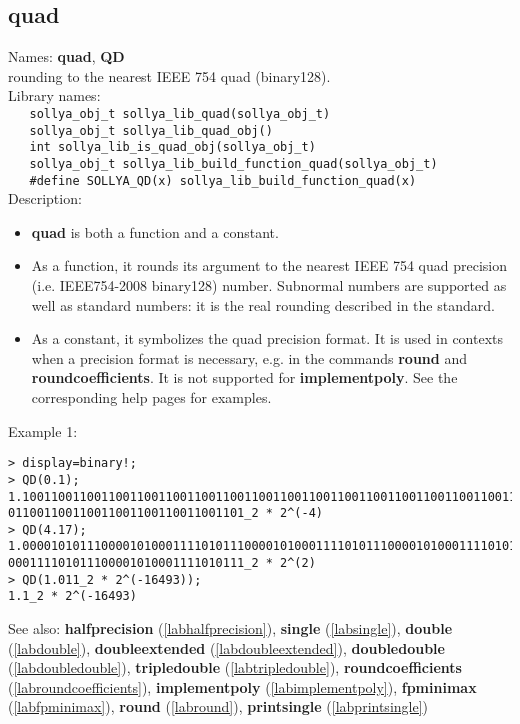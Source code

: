 \subsection{quad}
\label{labquad}
\noindent Names: \textbf{quad}, \textbf{QD}\\
\phantom{aaa}rounding to the nearest IEEE 754 quad (binary128).\\[0.2cm]
\noindent Library names:\\
\verb|   sollya_obj_t sollya_lib_quad(sollya_obj_t)|\\
\verb|   sollya_obj_t sollya_lib_quad_obj()|\\
\verb|   int sollya_lib_is_quad_obj(sollya_obj_t)|\\
\verb|   sollya_obj_t sollya_lib_build_function_quad(sollya_obj_t)|\\
\verb|   #define SOLLYA_QD(x) sollya_lib_build_function_quad(x)|\\[0.2cm]
\noindent Description: \begin{itemize}

\item \textbf{quad} is both a function and a constant.

\item As a function, it rounds its argument to the nearest IEEE 754 quad precision (i.e. IEEE754-2008 binary128) number.
   Subnormal numbers are supported as well as standard numbers: it is the real
   rounding described in the standard.

\item As a constant, it symbolizes the quad precision format. It is used in 
   contexts when a precision format is necessary, e.g. in the commands 
   \textbf{round} and \textbf{roundcoefficients}. It is not supported for \textbf{implementpoly}.
   See the corresponding help pages for examples.
\end{itemize}
\noindent Example 1: 
\begin{center}\begin{minipage}{15cm}\begin{Verbatim}[frame=single,commandchars=\\\|\~]
> display=binary!;
> QD(0.1);
1.100110011001100110011001100110011001100110011001100110011001100110011001100110
011001100110011001100110011001101_2 * 2^(-4)
> QD(4.17);
1.000010101110000101000111101011100001010001111010111000010100011110101110000101
000111101011100001010001111010111_2 * 2^(2)
> QD(1.011_2 * 2^(-16493));
1.1_2 * 2^(-16493)
\end{Verbatim}
\end{minipage}\end{center}
See also: \textbf{halfprecision} (\ref{labhalfprecision}), \textbf{single} (\ref{labsingle}), \textbf{double} (\ref{labdouble}), \textbf{doubleextended} (\ref{labdoubleextended}), \textbf{doubledouble} (\ref{labdoubledouble}), \textbf{tripledouble} (\ref{labtripledouble}), \textbf{roundcoefficients} (\ref{labroundcoefficients}), \textbf{implementpoly} (\ref{labimplementpoly}), \textbf{fpminimax} (\ref{labfpminimax}), \textbf{round} (\ref{labround}), \textbf{printsingle} (\ref{labprintsingle})
